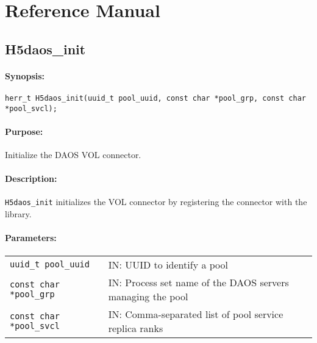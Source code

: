 \documentclass[../users_guide.tex]{subfiles}
\begin{document}
\section{Reference Manual}
\label{apdx:ref_manual}

\subsection{H5daos\_init}
\label{ref:h5daos_init}

\paragraph{Synopsis:}
\begin{flushleft}%
\begin{verbatim}
herr_t H5daos_init(uuid_t pool_uuid, const char *pool_grp, const char *pool_svcl);
\end{verbatim}
\end{flushleft}%

\paragraph{Purpose:}
\begin{flushleft}%
Initialize the DAOS VOL connector.
\end{flushleft}%

\paragraph{Description:}
\begin{flushleft}%
\texttt{H5daos\_init} initializes the VOL connector by registering the connector with
the library.
\end{flushleft}%

\paragraph{Parameters:}
\begin{flushleft}%
 \begin{tabular}{ll}%
   \texttt{uuid\_t pool\_uuid} & IN: UUID to identify a pool \\
   \texttt{const char *pool\_grp} & IN: Process set name of the DAOS servers managing the pool \\
   \texttt{const char *pool\_svcl} & IN: Comma-separated list of pool service replica ranks \\
 \end{tabular}%
\end{flushleft}%
\end{document}
